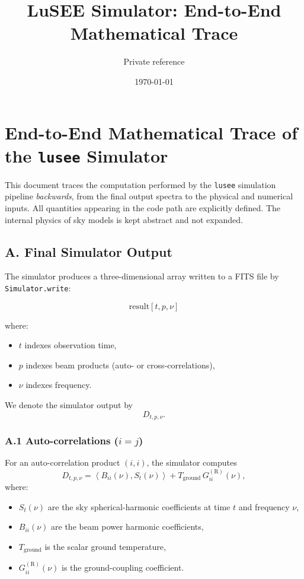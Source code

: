 \documentclass[11pt]{article}
\title{LuSEE Simulator: End-to-End Mathematical Trace}
\author{Private reference}
\date{\today}
\begin{document}
\maketitle

\section*{End-to-End Mathematical Trace of the \texttt{lusee} Simulator}

This document traces the computation performed by the \texttt{lusee} simulation pipeline \emph{backwards}, from the final output spectra to the physical and numerical inputs. All quantities appearing in the code path are explicitly defined. The internal physics of sky models is kept abstract and not expanded.

\subsection*{A. Final Simulator Output}

The simulator produces a three-dimensional array written to a FITS file by \texttt{Simulator.write}:

\[
\mathrm{result}[t, p, \nu]
\]

where:
\begin{itemize}
\item $t$ indexes observation time,
\item $p$ indexes beam products (auto- or cross-correlations),
\item $\nu$ indexes frequency.
\end{itemize}

We denote the simulator output by
\[
D_{t,p,\nu}.
\]

\subsubsection*{A.1 Auto-correlations ($i=j$)}

For an auto-correlation product $(i,i)$, the simulator computes
\[
D_{t,p,\nu}
=
\left\langle B_{ii}(\nu), S_t(\nu) \right\rangle
+
T_{\mathrm{ground}}\,G^{(\mathrm{R})}_{ii}(\nu),
\]
where:
\begin{itemize}
\item $S_t(\nu)$ are the sky spherical-harmonic coefficients at time $t$ and frequency $\nu$,
\item $B_{ii}(\nu)$ are the beam power harmonic coefficients,
\item $T_{\mathrm{ground}}$ is the scalar ground temperature,
\item $G^{(\mathrm{R})}_{ii}(\nu)$ is the ground-coupling coefficient.
\end{itemize}
\end{document}
